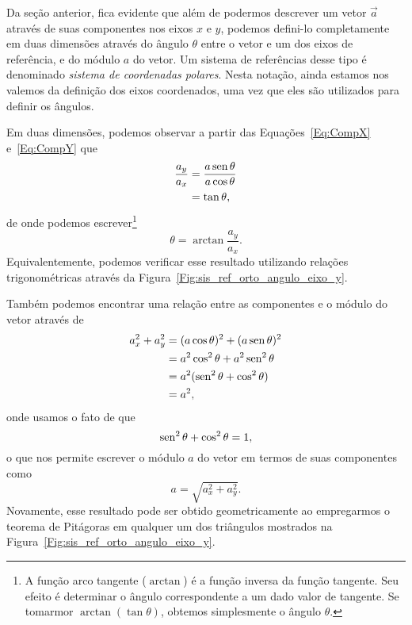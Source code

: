 Da seção anterior, fica evidente que além de podermos descrever um vetor $\vec{a}$ através de suas componentes nos eixos $x$ e $y$, podemos defini-lo completamente em duas dimensões através do ângulo $\theta$ entre o vetor e um dos eixos de referência, e do módulo $a$ do vetor. Um sistema de referências desse tipo é denominado \emph{sistema de coordenadas polares}. Nesta notação, ainda estamos nos valemos da definição dos eixos coordenados, uma vez que eles são utilizados para definir os ângulos. 

Em duas dimensões, podemos observar a partir das Equações~\eqref{Eq:CompX} e~\eqref{Eq:CompY} que
\begin{align}
  \frac{a_y}{a_x} &=\frac{a\operatorname{sen}\theta}{a\cos\theta} \\
  &= \tan\theta,
\end{align}
%
de onde podemos escrever\footnote{A função arco tangente ($\arctan$) é a função inversa da função tangente. Seu efeito é determinar o ângulo correspondente a um dado valor de tangente. Se tomarmor $\arctan(\tan \theta)$, obtemos simplesmente o ângulo $\theta$.}
\begin{equation}\label{Eq:AngaPartirDeComp}
  \theta = \arctan\frac{a_y}{a_x}.
\end{equation}
%
Equivalentemente, podemos verificar esse resultado utilizando relações trigonométricas através da  Figura~\ref{Fig:sis_ref_orto_angulo_eixo_y}.

Também podemos encontrar uma relação entre as componentes e o módulo do vetor através de
\begin{align}
  a_ x^2 + a_y^2 &= (a\cos\theta) ^2 + (a\operatorname{sen}\theta)^2 \\
  &= a^2\cos^2\theta + a^2\operatorname{sen}^2\theta \\
  &= a^2(\operatorname{sen}^2\theta + \cos^2\theta) \\
  &= a^2,
\end{align}
%
onde usamos o fato de que
\begin{equation}
    \operatorname{sen}^2\theta + \cos^2\theta = 1,
\end{equation}
%
o que nos permite escrever o módulo $a$ do vetor em termos de suas componentes como
\begin{equation}\label{Eq:ModAPartirDeComp}
    a = \sqrt{a_x^2 + a_y^2}.
\end{equation}
%
Novamente, esse resultado pode ser obtido geometricamente ao empregarmos o teorema de Pitágoras em qualquer um dos triângulos mostrados na Figura~\ref{Fig:sis_ref_orto_angulo_eixo_y}.

